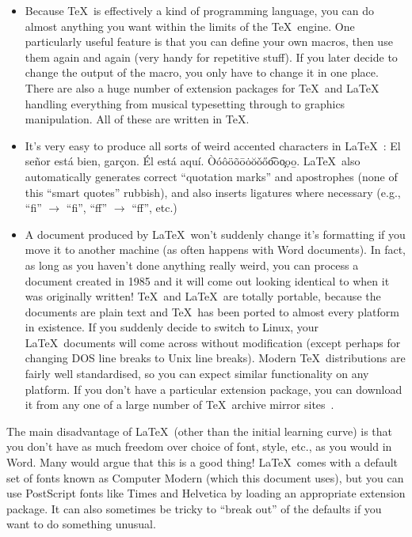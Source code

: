 \documentclass[12pt,a4paper]{article}
\begin{document}
\begin{itemize}
	\item Because \TeX\ is effectively a kind of programming language,
	you can do almost anything you want within the limits of the \TeX\
	engine. One particularly useful feature is that you can define your
	own macros, then use them again and again (very handy for repetitive
	stuff). If you later decide to change the output of the macro, you
	only have to change it in one place. There are also a huge number of
	extension packages for \TeX\ and \LaTeX\, handling everything from
	musical typesetting through to graphics manipulation. All of these
	are written in \TeX.
	
	\item It's very easy to produce all sorts of weird accented
	characters in \LaTeX~\cite{UsersGuide}: El se\~{n}or est\'{a} bien,
	gar\c{c}on. \'{E}l est\'{a} aqu\'{i}.
	\`{O}\'{o}\^{o}\"{o}\~{o}\={o}\.{o}\u{o}\v{o}\H{o}\t{oo}\c{o}\d{o}\b
	{o}. \LaTeX\ also automatically generates correct ``quotation
	marks'' and apostrophes (none of this ``smart quotes'' rubbish), and
	also inserts ligatures where necessary (e.g., ``f{}i''
	\(\rightarrow\) ``fi'', ``f{}f'' \(\rightarrow\) ``ff'', etc.)

	\item A document produced by \LaTeX\ won't suddenly change it's
	formatting if you move it to another machine (as often happens with
	Word documents). In fact, as long as you haven't done anything
	really weird, you can process a document created in 1985 and it will
	come out looking identical to when it was originally written! \TeX\
	and \LaTeX\ are totally portable, because the documents are plain
	text and \TeX\ has been ported to almost every platform in
	existence. If you suddenly decide to switch to Linux, your \LaTeX\
	documents will come across without modification (except perhaps for
	changing DOS line breaks to Unix line breaks). Modern \TeX\
	distributions are fairly well standardised, so you can expect
	similar functionality on any platform. If you don't have a
	particular extension package, you can download it from any one of a
	large number of \TeX\ archive mirror sites~\cite{CTAN}.

\end{itemize}

The main disadvantage of \LaTeX\ (other than the initial learning curve)
is that you don't have as much freedom over choice of font, style, etc.,
as you would in Word. Many would argue that this is a good thing!
\LaTeX\ comes with a default set of fonts known as Computer Modern
(which this document uses), but you can use PostScript fonts like
{\fontfamily{ptm}\selectfont Times} and {\fontfamily{phv}\selectfont
Helvetica} by loading an appropriate extension package. It can also
sometimes be tricky to ``break out'' of the defaults if you want to do
something unusual.
\end{document}
